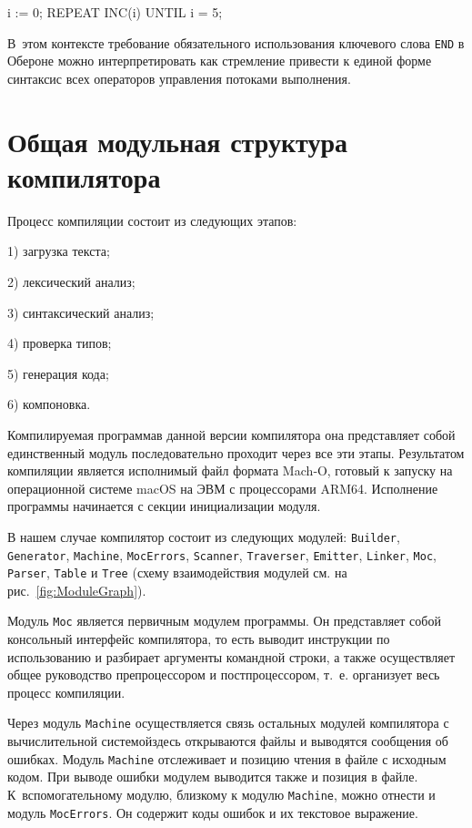 \documentclass[utf8]{lgu}
\newcommand{\tire}{\unskip\nobreak\thinspace\textemdash\thinspace}
\newcommand{\code}[1]{{\normalsize\texttt{#1}}}
\begin{document}
\begin{listing}[H]
\caption{REPEAT UNTIL в Паскале, Модуле‑2 и Обероне}
\vspace{-17pt}
\begin{modula2}
i := 0;
REPEAT
  INC(i)
UNTIL i = 5;
\end{modula2}
\end{listing}

В~этом контексте требование обязательного использования ключевого слова \code{END} в Обероне можно интерпретировать как стремление привести к единой форме синтаксис всех операторов управления потоками выполнения.

\section{Общая модульная структура компилятора}

\firstparskip Процесс компиляции состоит из следующих этапов:

1) загрузка текста;

2) лексический анализ;

3) синтаксический анализ;

4) проверка типов;

5) генерация кода;

6) компоновка.

Компилируемая программа\tire в данной версии компилятора она представляет собой единственный модуль \tire последовательно проходит через все эти этапы. Результатом компиляции является исполнимый файл формата Mach‑O, готовый к запуску на операционной системе macOS на ЭВМ с процессорами ARM64. Исполнение программы начинается с секции инициализации модуля.

В нашем случае компилятор состоит из следующих модулей: \code{Builder}, \code{Generator}, \code{Machine}, \code{MocErrors}, \code{Scanner}, \code{Traverser}, \code{Emitter}, \code{Linker}, \code{Moc}, \code{Parser}, \code{Table} и \code{Tree} (схему взаимодействия модулей см. на рис.~\ref{fig:ModuleGraph}).

Модуль \code{Moc} является первичным модулем программы. Он представляет собой консольный интерфейс компилятора, то есть выводит инструкции по использованию и разбирает аргументы командной строки, а также осуществляет общее руководство препроцессором и постпроцессором, т.~е. организует весь процесс компиляции.

Через модуль \code{Machine} осуществляется связь остальных модулей компилятора с вычислительной системой\tire здесь открываются файлы и выводятся сообщения об ошибках. Модуль \code{Machine} отслеживает и позицию чтения в файле с исходным кодом. При выводе ошибки модулем выводится также и позиция в файле. К~вспомогательному модулю, близкому к модулю \code{Machine}, можно отнести и модуль \code{MocErrors}. Он содержит коды ошибок и их текстовое выражение.
\end{document}
